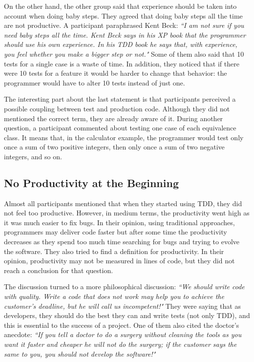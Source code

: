 On the other hand, the other group said that experience should be taken into
account when doing baby steps.
They agreed that doing baby steps all the time are not productive. A participant
paraphrased Kent Beck: \textit{``I am not sure if you need baby steps all the
time. Kent Beck says in his XP book that the programmer should use his own
experience. In his TDD book he says that, with experience, you feel whether you
make a bigger step or not."}
Some of them also said that 10 tests for a single case is a waste of time. In
addition, they noticed that if there were 10 tests for a feature it would be
harder to change that behavior: the programmer would have to alter 10 tests
instead of just one.

The interesting part about the last statement is that participants perceived a
possible coupling between test and production code. Although they did not
mentioned the correct term, they are already aware of it.
During another question, a participant commented about testing one case of each
equivalence class. It means that, in the calculator example, the programmer
would test only once a sum of two positive integers, then only once a sum of two
negative integers, and so on.

\subsection{No Productivity at the Beginning}

Almost all participants mentioned that when they started using TDD, they did not
feel too productive. However, in medium terms, the productivity went high as it
was much easier to fix bugs. In their opinion, using traditional approaches,
programmers may deliver code faster but after some time the productivity
decreases as they spend too much time searching for bugs and trying to evolve
the software.
They also tried to find a definition for productivity. In their opinion,
productivity may not be measured in lines of code, but they did not reach a
conclusion for that question.

The discussion turned to a more philosophical discussion: \textit{``We should
write code with quality. Write a code that does not work may help you to achieve
the customer's deadline, but he will call us incompetent!"} They were saying
that as developers, they should do the best they can and write tests (not only
TDD), and this is essential to the success of a project. One of them also cited
the doctor's anecdote: \textit{``If you tell a doctor to do a surgery without
cleaning the tools as you want it faster and cheaper he will not do the surgery;
if the customer says the same to you, you should not develop the software!"}

